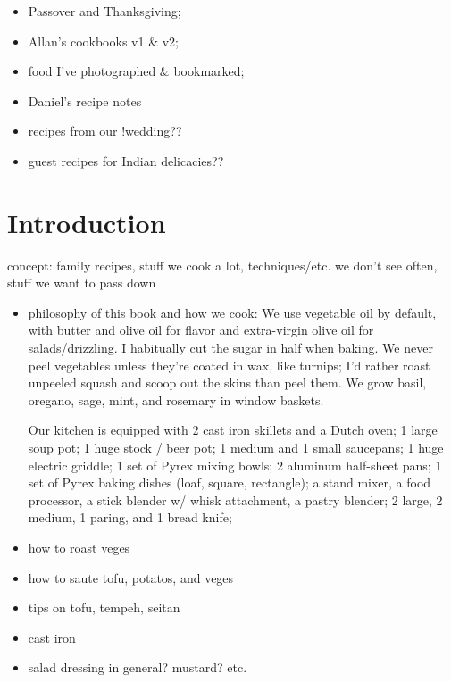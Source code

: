 \documentclass{article}
\begin{document}
\tableofcontents

\begin{itemize}
 \item Passover and Thanksgiving;
 \item Allan’s cookbooks v1 & v2;
 \item food I’ve photographed & bookmarked;
 \item Daniel’s recipe notes
 \item recipes from our !wedding??
 \item guest recipes for Indian delicacies??
\end{itemize}

\section{Introduction}
concept: family recipes, stuff we cook a lot, techniques/etc. we don't see often, stuff we want to pass down

\begin{itemize}
 \item philosophy of this book and how we cook: We use vegetable oil by default, with butter and olive oil for flavor and extra-virgin olive oil for salads/drizzling. I habitually cut the sugar in half when baking. We never peel vegetables unless they're coated in wax, like turnips; I'd rather roast unpeeled squash and scoop out the skins than peel them. We grow basil, oregano, sage, mint, and rosemary in window baskets.

       Our kitchen is equipped with 2 cast iron skillets and a Dutch oven; 1 large soup pot; 1 huge stock / beer pot; 1 medium and 1 small saucepans; 1 huge electric griddle; 1 set of Pyrex mixing bowls; 2 aluminum half-sheet pans; 1 set of Pyrex baking dishes (loaf, square, rectangle); a stand mixer, a food processor, a stick blender w/ whisk attachment, a pastry blender; 2 large, 2 medium, 1 paring, and 1 bread knife;

 \item how to roast veges
 \item how to saute tofu, potatos, and veges
 \item tips on tofu, tempeh, seitan
 \item cast iron
 \item salad dressing in general? mustard? etc.
\end{itemize}
\end{document}
